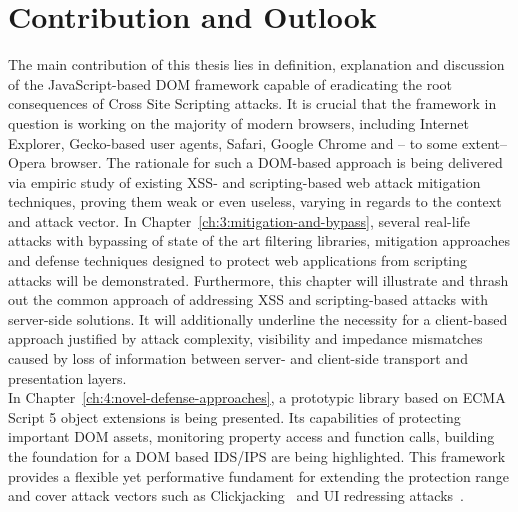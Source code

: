   \section{Contribution and Outlook}
  \label{subsec:1.4.contribution_and_outlook}

  The main contribution of this thesis lies in definition, explanation and discussion of the JavaScript-based DOM framework capable of eradicating the root consequences of Cross Site Scripting attacks. It is crucial that the framework in question is working on the majority of modern browsers, including Internet Explorer, Gecko-based user agents, Safari, Google Chrome and -- to some extent-- Opera browser. The rationale for such a DOM-based approach is being delivered via empiric study of existing XSS- and scripting-based web attack mitigation techniques, proving them weak or even useless, varying in regards to the context and attack vector. In Chapter~\ref{ch:3:mitigation-and-bypass}, several real-life attacks with bypassing of state of the art filtering libraries, mitigation approaches and defense techniques designed to protect web applications from scripting attacks will be demonstrated. Furthermore, this chapter will illustrate and thrash out the common approach of addressing XSS and scripting-based attacks with server-side solutions. It will additionally underline the necessity for a client-based approach justified by attack complexity, visibility and impedance mismatches caused by loss of information between server- and client-side transport and presentation layers.\\

  In Chapter~\ref{ch:4:novel-defense-approaches}, a prototypic library based on ECMA Script 5 object extensions is being presented. Its capabilities of protecting important DOM assets, monitoring property access and function calls, building the foundation for a DOM based IDS/IPS are being highlighted. This framework provides a flexible yet performative fundament for extending the protection range and cover attack vectors such as Clickjacking~\cite{balduzzi2010solution,rydstedt_busting_2010} and UI redressing attacks~\cite{niemietz2011uiRedressing}. \\

